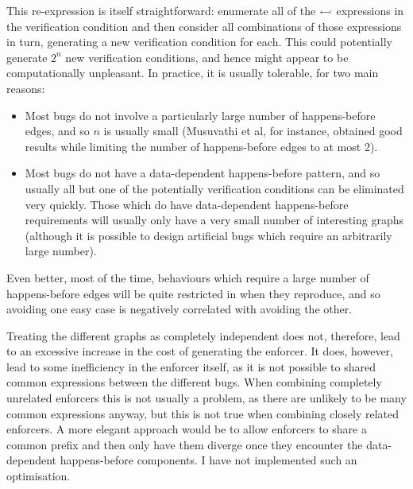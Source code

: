 This re-expression is itself straightforward: enumerate all of the
$\leftarrowtail$ expressions in the verification condition and
then consider all combinations of those expressions in turn,
generating a new verification condition for each.  This could
potentially generate $2^n$ new verification conditions, and hence
might appear to be computationally unpleasant.  In practice, it is
usually tolerable, for two main reasons:

\begin{itemize}
\item
  Most bugs do not involve a particularly large number of
  happens-before edges, and so $n$ is usually small (Musuvathi et
  al\cite{Musuvathi2007}, for instance, obtained good results while
  limiting the number of happens-before edges to at most 2).
\item
  Most bugs do not have a data-dependent happens-before pattern, and
  so usually all but one of the potentially verification conditions
  can be eliminated very quickly.  Those which do have data-dependent
  happens-before requirements will usually only have a very small
  number of interesting graphs (although it is possible to design
  artificial bugs which require an arbitrarily large number).
\end{itemize}

Even better, most of the time, behaviours which require a large number
of happens-before edges will be quite restricted in when they
reproduce, and so avoiding one easy case is negatively correlated with
avoiding the other.


Treating the different graphs as completely independent does not,
therefore, lead to an excessive increase in the cost of generating the
enforcer.  It does, however, lead to some inefficiency in the enforcer
itself, as it is not possible to shared common expressions between the
different bugs.  When combining completely unrelated enforcers this is
not usually a problem, as there are unlikely to be many common
expressions anyway, but this is not true when combining closely
related enforcers.  A more elegant approach would be to allow
enforcers to share a common prefix and then only have them diverge
once they encounter the data-dependent happens-before components.  I
have not implemented such an optimisation.

